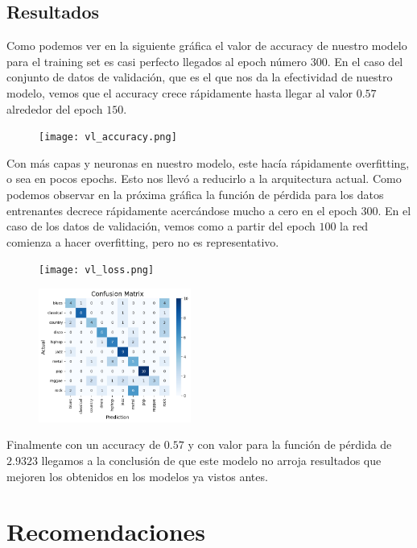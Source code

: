 \documentclass[colorinlistoftodos,twoside,twocolumn,10pt]{article} %
\begin{document}
\subsection{Resultados}

Como podemos ver en la siguiente gr\'afica el valor de accuracy de nuestro modelo para el training set es casi perfecto llegados al epoch n\'umero $300$. En el caso del conjunto de  datos de validaci\'on, que es el que nos da la efectividad de nuestro modelo, vemos que el accuracy crece r\'apidamente hasta llegar al valor $0.57$ alrededor del epoch $150$.

\begin{figure}[h!]
	\texttt{[image: vl\_accuracy.png]}
\end{figure}

Con m\'as capas y neuronas en nuestro modelo, este hac\'ia r\'apidamente overfitting, o sea en pocos epochs. Esto nos llev\'o a reducirlo a la arquitectura actual. Como podemos observar en la pr\'oxima gr\'afica la funci\'on de p\'erdida para los datos entrenantes decrece r\'apidamente acerc\'andose mucho a cero en el epoch $300$. En el caso de los datos de validaci\'on, vemos como a partir del epoch $100$ la red comienza a hacer overfitting, pero no es representativo. 

\begin{figure}[h!]
	\texttt{[image: vl\_loss.png]}
\end{figure}


\begin{figure}[h!]
	\includegraphics[width=5cm]{vl_confussion_matrix.png}
\end{figure}

Finalmente con un accuracy de $0.57$ y con valor para la funci\'on de p\'erdida de  $2.9323$ llegamos a la conclusi\'on de que este modelo no arroja resultados que mejoren los obtenidos en los modelos ya vistos antes.

	\section{Recomendaciones}
  
\end{document}
